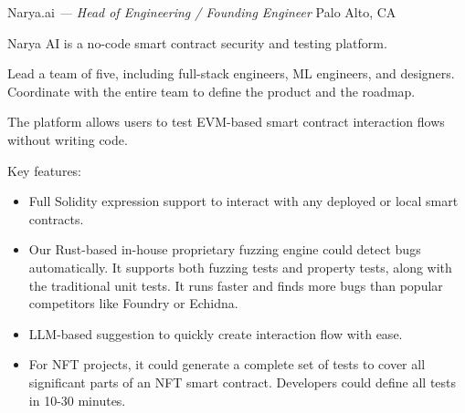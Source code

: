 \documentclass[]{friggeri-cv} %
\begin{document}
\begin{entrylist}
  {Narya.ai \emph{--- Head of Engineering / Founding Engineer}}
  {Palo Alto, CA}
  {
    Narya AI is a no-code smart contract security and testing platform.

    Lead a team of five, including full-stack engineers, ML engineers, and designers.
    Coordinate with the entire team to define the product and the roadmap.

    The platform allows users to test EVM-based smart contract interaction flows without writing code.

    Key features:
    \begin{itemize}
      \item Full Solidity expression support to interact with any deployed or local smart contracts.
      \item Our Rust-based in-house proprietary fuzzing engine could detect bugs automatically.
      It supports both fuzzing tests and property tests, along with the traditional unit tests.
      It runs faster and finds more bugs than popular competitors like Foundry or Echidna.
      \item LLM-based suggestion to quickly create interaction flow with ease.
      \item For NFT projects, it could generate a complete set of tests to cover all significant parts of an NFT smart contract.
      Developers could define all tests in 10-30 minutes.
    \end{itemize}

}
\end{entrylist}
\end{document}
